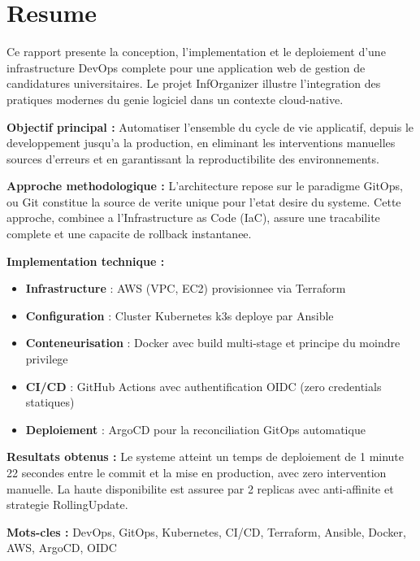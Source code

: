 \documentclass[12pt,a4paper,french]{report}
\begin{document}
\chapter*{Resume}

Ce rapport presente la conception, l'implementation et le deploiement d'une infrastructure DevOps complete pour une application web de gestion de candidatures universitaires. Le projet InfOrganizer illustre l'integration des pratiques modernes du genie logiciel dans un contexte cloud-native.

\textbf{Objectif principal :} Automatiser l'ensemble du cycle de vie applicatif, depuis le developpement jusqu'a la production, en eliminant les interventions manuelles sources d'erreurs et en garantissant la reproductibilite des environnements.

\textbf{Approche methodologique :}
L'architecture repose sur le paradigme GitOps, ou Git constitue la source de verite unique pour l'etat desire du systeme. Cette approche, combinee a l'Infrastructure as Code (IaC), assure une tracabilite complete et une capacite de rollback instantanee.

\textbf{Implementation technique :}
\begin{itemize}[noitemsep]
    \item \textbf{Infrastructure} : AWS (VPC, EC2) provisionnee via Terraform
    \item \textbf{Configuration} : Cluster Kubernetes k3s deploye par Ansible
    \item \textbf{Conteneurisation} : Docker avec build multi-stage et principe du moindre privilege
    \item \textbf{CI/CD} : GitHub Actions avec authentification OIDC (zero credentials statiques)
    \item \textbf{Deploiement} : ArgoCD pour la reconciliation GitOps automatique
\end{itemize}

\textbf{Resultats obtenus :}
Le systeme atteint un temps de deploiement de 1 minute 22 secondes entre le commit et la mise en production, avec zero intervention manuelle. La haute disponibilite est assuree par 2 replicas avec anti-affinite et strategie RollingUpdate.

\textbf{Mots-cles :} DevOps, GitOps, Kubernetes, CI/CD, Terraform, Ansible, Docker, AWS, ArgoCD, OIDC
\end{document}
